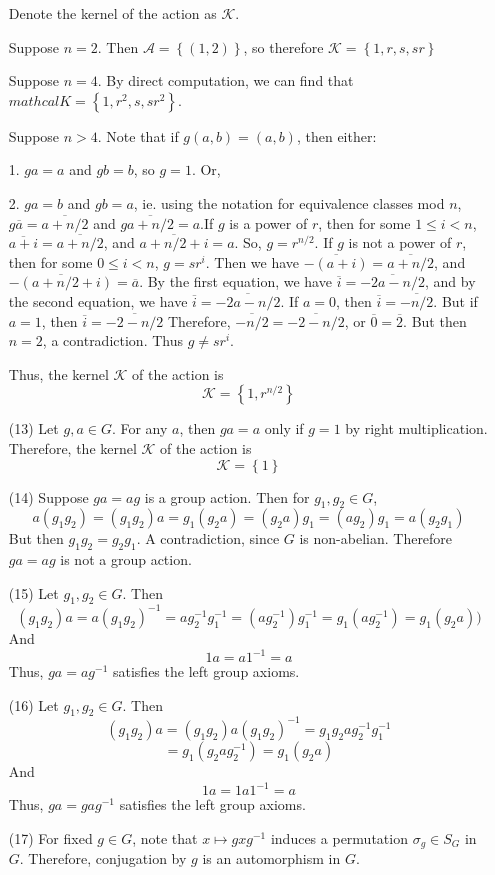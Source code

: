 \documentclass[12pt]{article}
\begin{document}
\begin{itemize}
Denote the kernel of the action as $\mathcal{K}$.

Suppose $n = 2$. Then $\mathcal{A} = \left\lbrace (1, 2) \right\rbrace$, so therefore $\mathcal{K} = \left\lbrace 1, r, s, sr \right\rbrace$

Suppose $n = 4$.  By direct computation, we can find that $mathcal{K} = \left\lbrace 1, r^2, s, sr^2 \right\rbrace$.

Suppose $n > 4$. Note that if $g(a, b) = (a, b)$, then either:

1. $ga = a$ and $gb = b$, so $g = 1$. Or, 

2. $ga = b$ and $gb = a$, ie. using the notation for equivalence classes mod $n$, $g\overline{a} = \overline{a + n/2}$ and $g\overline{a + n/2} = a$.If $g$ is a power of $r$, then for some $1 \leq i < n$, $\overline{a + i} = \overline{a + n/2}$, and $\overline{a + n/2 + i} = a$. So, $g = r^{n/2}$. If $g$ is not a power of $r$, then for some $0 \leq i < n$, $g = sr^i$. Then we have $\overline{-(a + i)} = \overline{a + n/2}$, and $\overline{-(a+ n/2 + i)} = \overline{a}$. By the first equation, we have $\overline{i} = \overline{-2a - n/2}$, and by the second equation, we have $\overline{i} = \overline{-2a - n/2}$. If $a = 0$, then $\overline{i} = \overline{-n/2}$. But if $a = 1$, then $\overline{i} = \overline{-2 - n/2}$ Therefore, $\overline{-n/2} = \overline{-2 - n/2}$, or $\overline{0} = \overline{2}$. But then $n = 2$, a contradiction. Thus $g \neq sr^i$.

Thus, the kernel $\mathcal{K}$ of the action is
$$\mathcal{K} = \left\lbrace 1, r^{n/2} \right\rbrace$$
\item[(13)]
Let $g, a \in G$. For any $a$, then $ga = a$ only if $g = 1$ by right multiplication. Therefore, the kernel $\mathcal{K}$ of the action is
$$\mathcal{K} = \left\lbrace 1 \right\rbrace$$
\item[(14)]
Suppose $ga = ag$ is a group action. Then for $g_1, g_2 \in G$, 
$$a(g_1g_2) = (g_1g_2)a = g_1(g_2a) = (g_2a)g_1 = (ag_2)g_1 = a(g_2g_1)$$
But then $g_1g_2 = g_2g_1$. A contradiction, since $G$ is non-abelian. Therefore $ga = ag$ is not a group action.
\item[(15)]
Let $g_1, g_2 \in G$. Then
$$(g_1g_2)a = a(g_1g_2)^{-1} = ag_2^{-1}g_1^{-1} = (ag_2^{-1})g_1^{-1} = g_1(ag_2^{-1}) = g_1(g_2a))$$
And
$$1a = a1^{-1} = a$$
Thus, $ga = ag^{-1}$ satisfies the left group axioms.
\item[(16)]
Let $g_1, g_2 \in G$. Then
$$(g_1g_2)a = (g_1g_2)a(g_1g_2)^{-1} = g_1g_2ag_2^{-1}g_1^{-1}$$
$$= g_1(g_2ag_2^{-1}) = g_1(g_2a)$$
And
$$1a = 1a1^{-1} = a$$
Thus, $ga = gag^{-1}$ satisfies the left group axioms.
\item[(17)]
For fixed $g \in G$, note that $x \mapsto gxg^{-1}$ induces a permutation $\sigma_g \in S_G$ in $G$. Therefore, conjugation by $g$ is an automorphism in $G$.


\end{itemize}
\end{document}
